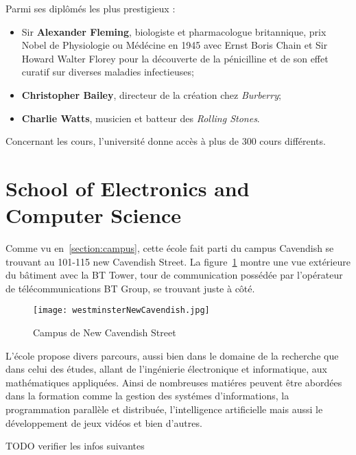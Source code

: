\noindent Parmi ses dipl\^om\'es les plus prestigieux :

\begin{itemize}
	\item Sir \textbf{Alexander Fleming}, biologiste et pharmacologue britannique, prix Nobel de Physiologie ou M\'ed\'ecine en 1945 avec Ernst Boris Chain et Sir Howard Walter Florey pour la d\'ecouverte de la p\'enicilline et de son effet curatif sur diverses maladies infectieuses;
	\item \textbf{Christopher Bailey}, directeur de la cr\'eation chez \textit{Burberry};
	\item \textbf{Charlie Watts}, musicien et batteur des \textit{Rolling Stones}.

\end{itemize}

\vspace{0.20cm}

Concernant les cours, l'universit\'e donne acc\`es \`a plus de 300 cours diff\'erents.

\section{School of Electronics and Computer Science}

Comme vu en~\ref{section:campus}, cette \'ecole fait parti du campus Cavendish se trouvant au 101-115 new Cavendish Street. 
La figure~\ref{figure:westminsterNewCavendish} montre une vue ext\'erieure du b\^atiment avec la BT Tower, tour de communication poss\'ed\'ee par l'op\'erateur de t\'el\'ecommunications BT Group, se trouvant juste \`a c\^ot\'e.

\begin{figure}[!ht]
	\centering
	\texttt{[image: westminsterNewCavendish.jpg]}
	\caption{Campus de New Cavendish Street}
	\label{figure:westminsterNewCavendish}

\end{figure}

L'\'ecole propose divers parcours, aussi bien dans le domaine de la recherche que dans celui des \'etudes, allant de l'ing\'enierie \'electronique et informatique, aux math\'ematiques appliqu\'ees.
Ainsi de nombreuses mati\'eres peuvent \^etre abord\'ees dans la formation comme la gestion des syst\'emes d'informations, la programmation parall\`ele et distribu\'ee, l'intelligence artificielle mais aussi le d\'eveloppement de jeux vid\'eos et bien d'autres.

TODO verifier les infos suivantes

